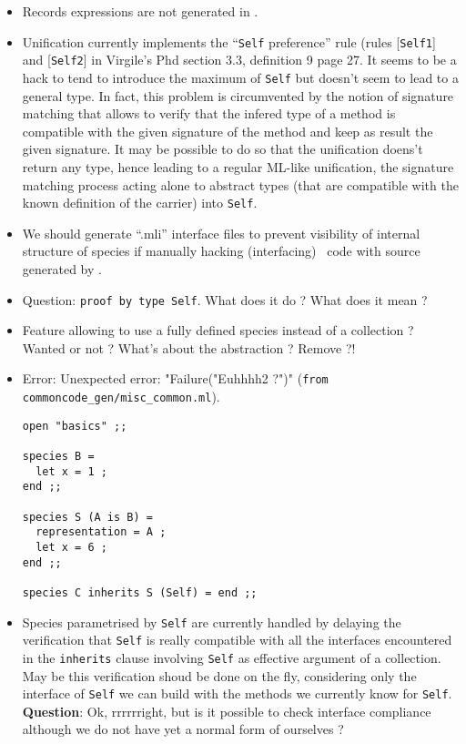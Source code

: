 \begin{itemize}
\item Records expressions are not generated in \coq.

\item Unification currently implements the ``{\tt Self} preference''
  rule (rules [{\tt Self1}] and [{\tt Self2}] in Virgile's Phd section
  3.3, definition 9 page 27. It seems to be a hack to tend to
  introduce the maximum of {\tt Self} but doesn't seem to lead to a
  general type. In fact, this problem is circumvented by the notion of
  signature matching that allows to verify that the infered type of a
  method is compatible with the given signature of the method and keep
  as result the given signature. It may be possible to do so that the
  unification doens't return any type, hence leading to a regular
  ML-like unification, the signature matching process acting alone to
  abstract types (that are compatible with the known definition of the
  carrier) into {\tt Self}.

\item We should generate ``.mli'' interface files to prevent
  visibility of internal structure of species if manually hacking
  (interfacing) \ocaml\ code with source generated by \focalizec.

\item Question: {\tt proof by type Self}. What does it do ? What does
  it mean ?

\item Feature allowing to use a fully defined species instead of a
collection ? Wanted or not ? What's about the abstraction ? Remove ?!

\item Error: Unexpected error: "Failure("Euhhhh2 ?")"
  ({\tt from commoncode\_gen/misc\_common.ml}).
\noindent
{\footnotesize
\begin{lstlisting}
open "basics" ;;

species B =
  let x = 1 ;
end ;;

species S (A is B) =
  representation = A ;
  let x = 6 ;
end ;;

species C inherits S (Self) = end ;;
\end{lstlisting}
}
\item Species parametrised by {\tt Self} are currently handled by
  delaying the verification that {\tt Self} is really compatible with
  all the interfaces encountered in the {\tt inherits} clause
  involving {\tt Self} as effective argument of a collection. May be
  this verification shoud be done on the fly, considering only the
  interface of {\tt Self} we can build with the methods we currently
  know for {\tt Self}. {\bf Question}: Ok, rrrrrright, but is it
  possible to check interface compliance although we do not have yet a
  normal form of ourselves ?


\end{itemize}
